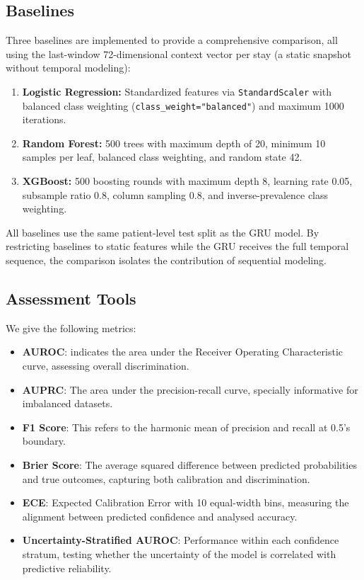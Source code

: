 \documentclass[conference]{IEEEtran}
\begin{document}
\subsection{Baselines}

Three baselines are implemented to provide a comprehensive comparison, all using the last-window 72-dimensional context vector per stay (a static snapshot without temporal modeling):

\begin{enumerate}
    \item \textbf{Logistic Regression:} Standardized features via \texttt{StandardScaler} with balanced class weighting (\texttt{class\_weight="balanced"}) and maximum 1000 iterations.
    \item \textbf{Random Forest:} 500 trees with maximum depth of 20, minimum 10 samples per leaf, balanced class weighting, and random state 42.
    \item \textbf{XGBoost:} 500 boosting rounds with maximum depth 8, learning rate 0.05, subsample ratio 0.8, column sampling 0.8, and inverse-prevalence class weighting.
\end{enumerate}

All baselines use the same patient-level test split as the GRU model. By restricting baselines to static features while the GRU receives the full temporal sequence, the comparison isolates the contribution of sequential modeling.

\subsection{Assessment Tools}

We give the following metrics:
\begin{itemize}
    \item \textbf{AUROC}: indicates the area under the Receiver Operating Characteristic curve, assessing overall discrimination.
    \item \textbf{AUPRC}: The area under the precision-recall curve, specially informative for imbalanced datasets.
    \item \textbf{F1 Score}: This refers to the harmonic mean of precision and recall at 0.5's boundary.
    \item \textbf{Brier Score}: The average squared difference between predicted probabilities and true outcomes, capturing both calibration and discrimination.
    \item \textbf{ECE}: Expected Calibration Error with 10 equal-width bins, measuring the alignment between predicted confidence and analysed accuracy.
    \item \textbf{Uncertainty-Stratified AUROC}: Performance within each confidence stratum, testing whether the uncertainty of the model is correlated with predictive reliability.
\end{itemize}
\end{document}
